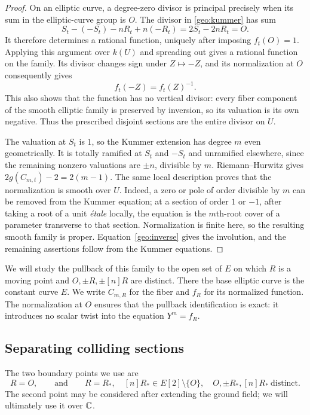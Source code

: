 \begin{proof}
On an elliptic curve, a degree-zero divisor is principal precisely when
its sum in the elliptic-curve group is $O$.  The divisor in
\eqref{geo:kummer} has sum
\[
 S_t-(-S_t)-nR_t+n(-R_t)=2S_t-2nR_t=O.
\]
It therefore determines a rational function, uniquely after imposing
$f_t(O)=1$.  Applying this argument over $k(U)$ and spreading out gives
a rational function on the family.  Its divisor changes sign under
$Z\mapsto-Z$, and its normalization at $O$ consequently gives
\begin{equation}\label{geo:inverse}
 f_t(-Z)=f_t(Z)^{-1}.
\end{equation}
This also shows that the function has no vertical divisor: every fiber
component of the smooth elliptic family is preserved by inversion, so
its valuation is its own negative.  Thus the prescribed disjoint sections
are the entire divisor on $U$.

The valuation at $S_t$ is $1$, so the Kummer extension has degree $m$
even geometrically.  It is totally ramified at $S_t$ and $-S_t$ and
unramified elsewhere, since the remaining nonzero valuations are
$\pm n$, divisible by $m$.  Riemann--Hurwitz gives
$2g(C_{m,t})-2=2(m-1)$.  The same local description proves that the
normalization is smooth over $U$.  Indeed, a zero or pole of order
divisible by $m$ can be removed from the Kummer equation; at a section
of order $1$ or $-1$, after taking a root of a unit \emph{\'etale}
locally, the equation is the $m$th-root cover of a parameter transverse
to that section.  Normalization is finite here, so the resulting smooth
family is proper.  Equation~\eqref{geo:inverse} gives the involution,
and the remaining assertions follow from the Kummer equations.
\end{proof}

We will study the pullback of this family to the open set of $E$ on which
$R$ is a moving point and $O,\pm R,\pm[n]R$ are distinct.  There the base
elliptic curve is the constant curve $E$.  We write $C_{m,R}$ for the
fiber and $f_R$ for its normalized function.  The normalization at $O$
ensures that the pullback identification is exact: it introduces no
scalar twist into the equation $Y^m=f_R$.

\subsection{Separating colliding sections}

The two boundary points we use are
\begin{equation}\label{geo:boundary-points}
 R=O,\qquad\text{and}\qquad
 R=R_*,\quad [n]R_*\in E[2]\setminus\{O\},
 \quad O,\pm R_*,[n]R_*\ \text{distinct}.
\end{equation}
The second point may be considered after extending the ground field;
we will ultimately use it over $\mathbb C$.

